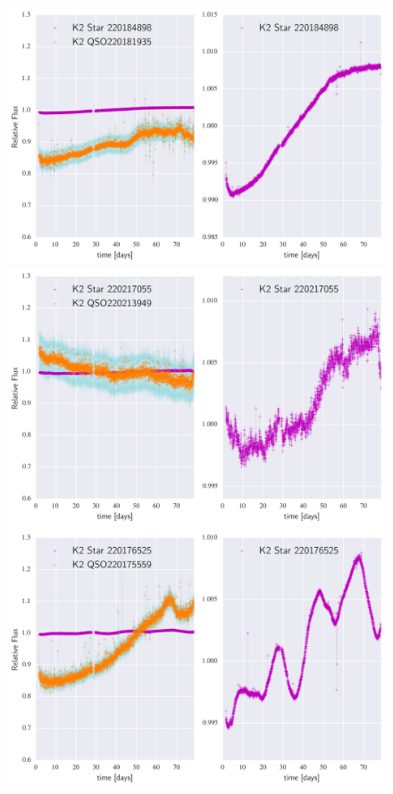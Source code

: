 \documentclass[a4paper,fleqn,usenatbib]{mnras}
\begin{document}
        \begin{figure}
 	\includegraphics[width=\columnwidth]{220181935NearestNeighbor.png}
 	\includegraphics[width=\columnwidth]{220213949NearestNeighbor.png}
 	\includegraphics[width=\columnwidth]{220175559NearestNeighbor.png}
        	\caption{}
        	\label{fig:example_figure}
        \end{figure}      
        
\end{document}
